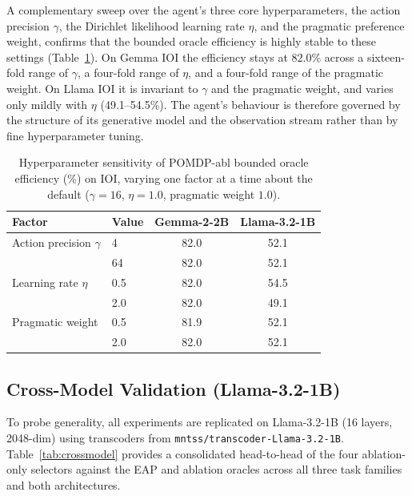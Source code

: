 A complementary sweep over the agent's three core hyperparameters, the
action precision $\gamma$, the Dirichlet likelihood learning rate $\eta$,
and the pragmatic preference weight, confirms that the bounded oracle
efficiency is highly stable to these settings
(Table~\ref{tab:hpsensitivity}).  On Gemma IOI the efficiency stays at
$82.0\%$ across a sixteen-fold range of $\gamma$, a four-fold range of
$\eta$, and a four-fold range of the pragmatic weight.  On Llama IOI it
is invariant to $\gamma$ and the pragmatic weight, and varies only
mildly with $\eta$ (49.1--54.5\%).  The agent's behaviour is therefore
governed by the structure of its generative model and the observation
stream rather than by fine hyperparameter tuning.

\begin{table}[H]
\centering
\caption{Hyperparameter sensitivity of POMDP-abl bounded oracle
efficiency (\%) on IOI, varying one factor at a time about the default
($\gamma{=}16$, $\eta{=}1.0$, pragmatic weight $1.0$).}
\label{tab:hpsensitivity}
{\small
\begin{tabular}{llcc}
\toprule
\textbf{Factor} & \textbf{Value} & \textbf{Gemma-2-2B} & \textbf{Llama-3.2-1B} \\
\midrule
Action precision $\gamma$ & 4   & 82.0 & 52.1 \\
                          & 64  & 82.0 & 52.1 \\
\midrule
Learning rate $\eta$      & 0.5 & 82.0 & 54.5 \\
                          & 2.0 & 82.0 & 49.1 \\
\midrule
Pragmatic weight          & 0.5 & 81.9 & 52.1 \\
                          & 2.0 & 82.0 & 52.1 \\
\bottomrule
\end{tabular}%
}
\end{table}


\subsection{Cross-Model Validation (Llama-3.2-1B)}

To probe generality, all experiments are replicated on Llama-3.2-1B
(16 layers, 2048-dim) using transcoders from
\texttt{mntss/transcoder-Llama-3.2-1B}.  Table~\ref{tab:crossmodel}
provides a consolidated head-to-head of the four ablation-only
selectors against the EAP and ablation oracles across all three task
families and both architectures.

